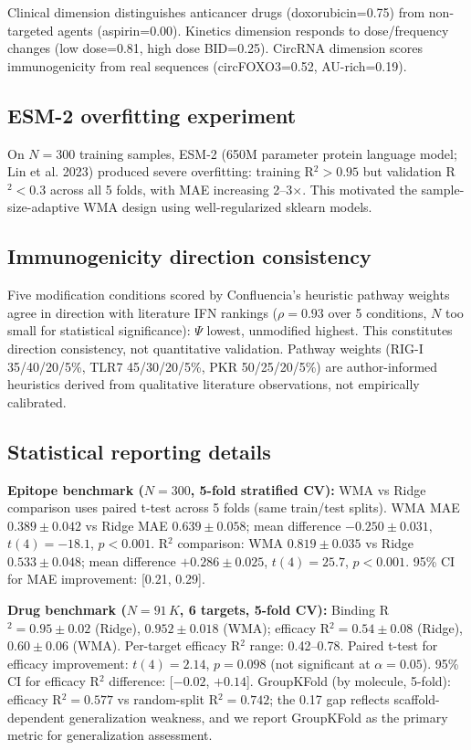 Clinical dimension distinguishes anticancer drugs (doxorubicin=0.75) from non-targeted agents (aspirin=0.00). Kinetics dimension responds to dose/frequency changes (low dose=0.81, high dose BID=0.25). CircRNA dimension scores immunogenicity from real sequences (circFOXO3=0.52, AU-rich=0.19).

\subsection*{ESM-2 overfitting experiment}

On $N{=}300$ training samples, ESM-2 (650M parameter protein language model; Lin et al. 2023) produced severe overfitting: training R$^2{>}0.95$ but validation R$^2{<}0.3$ across all 5 folds, with MAE increasing 2--3$\times$. This motivated the sample-size-adaptive WMA design using well-regularized sklearn models.

\subsection*{Immunogenicity direction consistency}

Five modification conditions scored by Confluencia's heuristic pathway weights agree in direction with literature IFN rankings ($\rho{=}0.93$ over 5 conditions, $N$ too small for statistical significance): $\Psi$ lowest, unmodified highest. This constitutes direction consistency, not quantitative validation. Pathway weights (RIG-I 35/40/20/5\%, TLR7 45/30/20/5\%, PKR 50/25/20/5\%) are author-informed heuristics derived from qualitative literature observations, not empirically calibrated.

\subsection*{Statistical reporting details}

\textbf{Epitope benchmark ($N{=}300$, 5-fold stratified CV):} WMA vs Ridge comparison uses paired t-test across 5 folds (same train/test splits). WMA MAE $0.389 \pm 0.042$ vs Ridge MAE $0.639 \pm 0.058$; mean difference $-0.250 \pm 0.031$, $t(4){=}-18.1$, $p{<}0.001$. R$^2$ comparison: WMA $0.819 \pm 0.035$ vs Ridge $0.533 \pm 0.048$; mean difference $+0.286 \pm 0.025$, $t(4){=}25.7$, $p{<}0.001$. 95\% CI for MAE improvement: [0.21, 0.29].

\textbf{Drug benchmark ($N{=}91\,K$, 6 targets, 5-fold CV):} Binding R$^2{=}0.95 \pm 0.02$ (Ridge), $0.952 \pm 0.018$ (WMA); efficacy R$^2{=}0.54 \pm 0.08$ (Ridge), $0.60 \pm 0.06$ (WMA). Per-target efficacy R$^2$ range: 0.42--0.78. Paired t-test for efficacy improvement: $t(4){=}2.14$, $p{=}0.098$ (not significant at $\alpha{=}0.05$). 95\% CI for efficacy R$^2$ difference: [$-0.02$, $+0.14$]. GroupKFold (by molecule, 5-fold): efficacy R$^2{=}0.577$ vs random-split R$^2{=}0.742$; the 0.17 gap reflects scaffold-dependent generalization weakness, and we report GroupKFold as the primary metric for generalization assessment.

